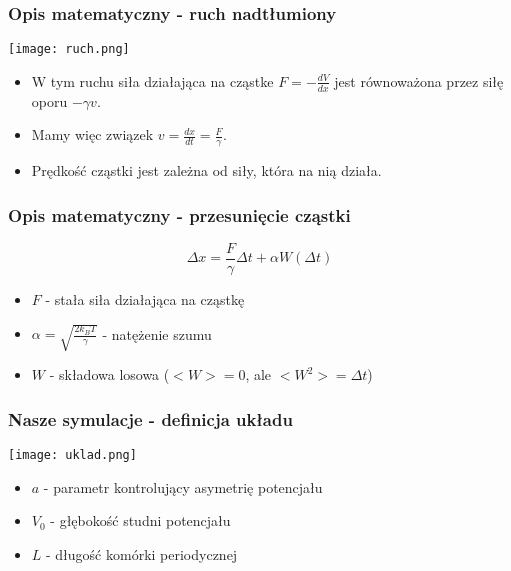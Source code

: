\documentclass[10pt]{beamer}
\begin{document}
	\begin{frame}
		\frametitle{Opis matematyczny - ruch nadtłumiony}
		\begin{minipage}{1\textwidth}
			\Centering
			\texttt{[image: ruch.png]}
		\end{minipage}
		\begin{minipage}{1\textwidth}
			\begin{itemize}
				\vspace{0.5cm}
				\item W tym ruchu siła działająca na cząstke $F=-\frac{dV}{dx}$ jest równoważona przez siłę oporu $-\gamma v$.
				\item Mamy więc związek $v=\frac{dx}{dt}=\frac{F}{\gamma}$.	
				\item Prędkość cząstki jest zależna od siły, która na nią działa.
			\end{itemize}
		\end{minipage}
	\end{frame}
	\begin{frame}
		\frametitle{Opis matematyczny - przesunięcie cząstki}
		\begin{minipage}{1\textwidth}
			\begin{equation}
				\nonumber
				\boxed{\Delta x=\frac F \gamma \Delta t+\alpha W(\Delta t)}
			\end{equation}
			\vspace{0.4cm}
			\begin{itemize}
				\item $F$ - stała siła działająca na cząstkę
				\item $\alpha = \sqrt{\frac{2 k_B T}{\gamma}}$ - natężenie szumu
				\item $W$ - składowa losowa ($<W>=0$, ale $<W^2>=\Delta t$)
			\end{itemize}
		\end{minipage}
	\end{frame}
	\begin{frame}
		\frametitle{Nasze symulacje - definicja układu}
		\begin{minipage}{1\textwidth}
			\Centering
			\texttt{[image: uklad.png]}
		\end{minipage}
		\begin{minipage}{1\textwidth}
			\begin{itemize}
				\vspace{0.5cm}
				\item $a$ - parametr kontrolujący asymetrię potencjału
				\item $V_0$ - głębokość studni potencjału
				\item $L$ - długość komórki periodycznej
			\end{itemize}
		\end{minipage}
	\end{frame}
\end{document}
